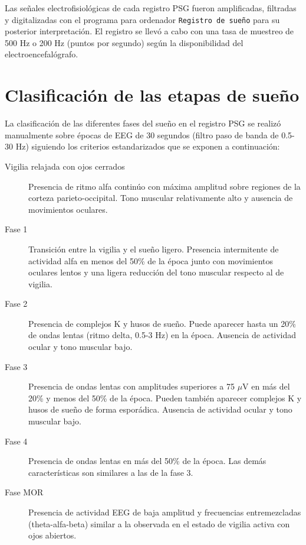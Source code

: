 Las se\~nales electrofisiol\'ogicas de cada registro PSG fueron amplificadas, filtradas y 
digitalizadas con el programa para ordenador \texttt{Registro de sue\~no} 
para su posterior interpretaci\'on. 
El registro se llev\'o a cabo con una tasa de muestreo de 500 Hz o 200 Hz (puntos por segundo)
seg\'un la disponibilidad del electroencefal\'ografo.


\section{Clasificaci\'on de las etapas de sue\~no}

La clasificaci\'on de las diferentes fases del sue\~no en el registro PSG se realiz\'o manualmente 
sobre \'epocas de EEG de 30 segundos (filtro paso de banda de 0.5-30 Hz) siguiendo los criterios 
estandarizados que se exponen a continuación\cite{Hori01}:
\begin{description}
\item[Vigilia relajada con ojos cerrados] Presencia de ritmo alfa contin\'uo con m\'axima amplitud 
sobre regiones de la corteza parieto-occipital. Tono muscular relativamente alto y ausencia de 
movimientos oculares.

\item[Fase 1] Transici\'on entre la vigilia y el sue\~no ligero. Presencia intermitente de 
actividad alfa en menos del 50\% de la \'epoca junto con movimientos oculares lentos y una ligera 
reducci\'on del tono muscular respecto al de vigilia.

\item[Fase 2] Presencia de complejos K y husos de sue\~no. Puede aparecer hasta un 20\% de ondas 
lentas (ritmo delta, 0.5-3 Hz) en la \'epoca. Ausencia de actividad ocular y tono muscular bajo.

\item[Fase 3] Presencia de ondas lentas con amplitudes superiores a 75 $\mu$V en m\'as del
20\% y menos del 50\% de la \'epoca. Pueden tambi\'en aparecer complejos K y husos de sue\~no de 
forma espor\'adica. Ausencia de actividad ocular y tono muscular bajo.

\item[Fase 4] Presencia de ondas lentas en m\'as del 50\% de la época. Las dem\'as 
caracter\'isticas son similares a las de la fase 3.

\item[Fase MOR] Presencia de actividad EEG de baja amplitud y frecuencias entremezcladas 
(theta-alfa-beta) similar a la observada en el estado de vigilia activa con ojos abiertos.
\end{description}

